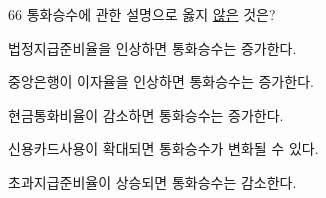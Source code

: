\begin{question}{66}
통화승수에 관한 설명으로 옳지 \uline{않은} 것은?
\begin{choices}
  \item 법정지급준비율을 인상하면 통화승수는 증가한다.
  \item 중앙은행이 이자율을 인상하면 통화승수는 증가한다.
  \item 현금통화비율이 감소하면 통화승수는 증가한다.
  \item 신용카드사용이 확대되면 통화승수가 변화될 수 있다.
  \item 초과지급준비율이 상승되면 통화승수는 감소한다.
\end{choices}
\end{question}
